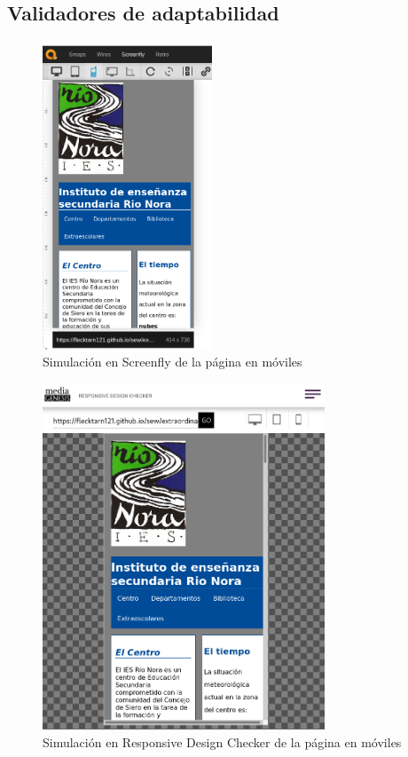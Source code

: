\documentclass[11pt]{article}
\begin{document}
\clearpage{}

\subsection{Validadores de adaptabilidad}

\begin{figure}[h]
    \centering
    \includegraphics[width=0.45\textwidth]{screenfly.png}
    \caption{Simulación en Screenfly de la página en móviles}
\end{figure}

\begin{figure}[h]
    \centering
    \includegraphics[width=0.75\textwidth]{responsive-design-checker.png}
    \caption{Simulación en Responsive Design Checker de la página en móviles}
\end{figure}
\end{document}
